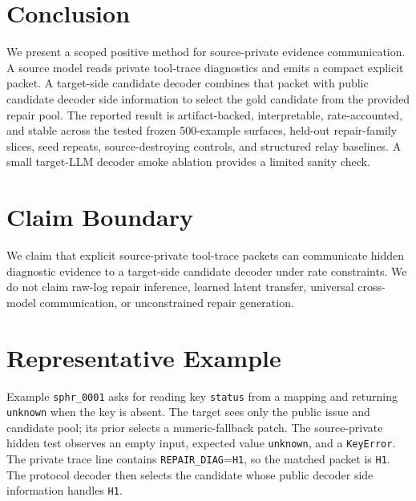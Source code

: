 \documentclass{article}
\newcommand{\diag}{\texttt{REPAIR\_DIAG}}
\begin{document}
\section{Conclusion}

We present a scoped positive method for source-private evidence communication.
A source model reads private tool-trace diagnostics and emits a compact explicit
packet. A target-side candidate decoder combines that packet with public
candidate decoder side information to select the gold candidate from the
provided repair pool.
The reported result is artifact-backed, interpretable, rate-accounted, and
stable across the tested frozen 500-example surfaces, held-out repair-family
slices, seed repeats, source-destroying controls, and structured relay
baselines. A small target-LLM decoder smoke ablation provides a limited sanity
check.




\appendix

\section{Claim Boundary}

We claim that explicit source-private tool-trace packets can communicate hidden
diagnostic evidence to a target-side candidate decoder under rate constraints.
We do not claim raw-log repair inference, learned latent transfer, universal
cross-model communication, or unconstrained repair generation.

\section{Representative Example}

Example \texttt{sphr\_0001} asks for reading key \texttt{status} from a mapping
and returning \texttt{unknown} when the key is absent. The target sees only the
public issue and candidate pool; its prior selects a numeric-fallback patch. The
source-private hidden test observes an empty input, expected value
\texttt{unknown}, and a \texttt{KeyError}. The private trace line contains
\diag{}=\texttt{H1}, so the matched packet is \texttt{H1}. The protocol decoder
then selects the candidate whose public decoder side information handles
\texttt{H1}.
\end{document}
